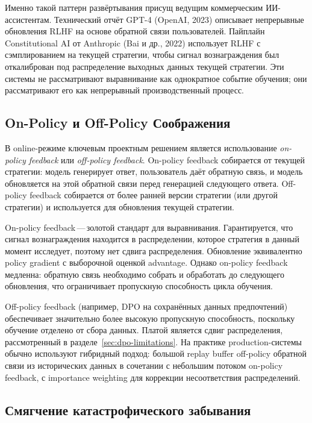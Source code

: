 Именно такой паттерн развёртывания присущ ведущим коммерческим ИИ-ассистентам. Технический отчёт GPT-4 (OpenAI, 2023) описывает непрерывные обновления RLHF на основе обратной связи пользователей. Пайплайн Constitutional AI от Anthropic (Bai и др., 2022) использует RLHF с сэмплированием на текущей стратегии, чтобы сигнал вознаграждения был откалиброван под распределение выходных данных текущей стратегии. Эти системы не рассматривают выравнивание как однократное событие обучения; они рассматривают его как непрерывный производственный процесс.

\subsection{On-Policy и Off-Policy Соображения}

В online-режиме ключевым проектным решением является использование \emph{on-policy feedback} или \emph{off-policy feedback}. On-policy feedback собирается от текущей стратегии: модель генерирует ответ, пользователь даёт обратную связь, и модель обновляется на этой обратной связи перед генерацией следующего ответа. Off-policy feedback собирается от более ранней версии стратегии (или другой стратегии) и используется для обновления текущей стратегии.

On-policy feedback\,---\,золотой стандарт для выравнивания. Гарантируется, что сигнал вознаграждения находится в распределении, которое стратегия в данный момент исследует, поэтому нет сдвига распределения. Обновление эквивалентно policy gradient с выборочной оценкой advantage. Однако on-policy feedback медленна: обратную связь необходимо собрать и обработать до следующего обновления, что ограничивает пропускную способность цикла обучения.

Off-policy feedback (например, DPO на сохранённых данных предпочтений) обеспечивает значительно более высокую пропускную способность, поскольку обучение отделено от сбора данных. Платой является сдвиг распределения, рассмотренный в разделе~\ref{sec:dpo-limitations}. На практике production-системы обычно используют гибридный подход: большой replay buffer off-policy обратной связи из исторических данных в сочетании с небольшим потоком on-policy feedback, с importance weighting для коррекции несоответствия распределений.

\subsection{Смягчение катастрофического забывания}

